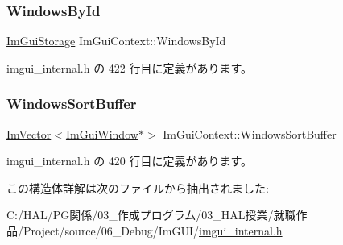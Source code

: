 \mbox{\label{struct_im_gui_context_adc1e46e1c1582a0f0eb74d957efedf98}} 
\subsubsection{\texorpdfstring{Windows\+By\+Id}{WindowsById}}
{\footnotesize\ttfamily \mbox{\hyperlink{struct_im_gui_storage}{Im\+Gui\+Storage}} Im\+Gui\+Context\+::\+Windows\+By\+Id}



 imgui\+\_\+internal.\+h の 422 行目に定義があります。

\mbox{\label{struct_im_gui_context_af33de778de28b057fa7a42e4cbe0017a}} 
\subsubsection{\texorpdfstring{Windows\+Sort\+Buffer}{WindowsSortBuffer}}
{\footnotesize\ttfamily \mbox{\hyperlink{class_im_vector}{Im\+Vector}}$<$\mbox{\hyperlink{struct_im_gui_window}{Im\+Gui\+Window}}$\ast$$>$ Im\+Gui\+Context\+::\+Windows\+Sort\+Buffer}



 imgui\+\_\+internal.\+h の 420 行目に定義があります。



この構造体詳解は次のファイルから抽出されました\+:\begin{DoxyCompactItemize}
\item 
C\+:/\+H\+A\+L/\+P\+G関係/03\+\_\+作成プログラム/03\+\_\+\+H\+A\+L授業/就職作品/\+Project/source/06\+\_\+\+Debug/\+Im\+G\+U\+I/\mbox{\hyperlink{imgui__internal_8h}{imgui\+\_\+internal.\+h}}\end{DoxyCompactItemize}
